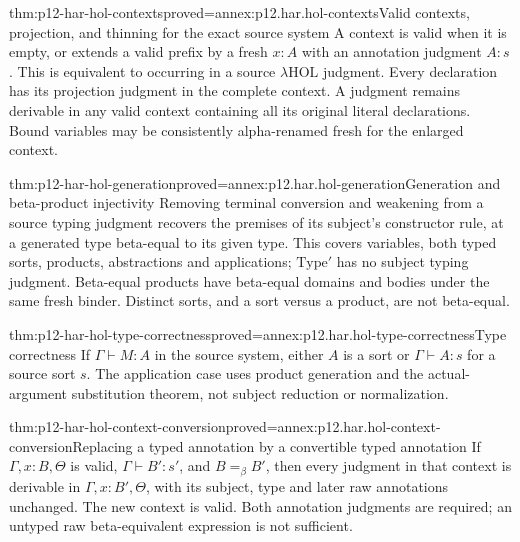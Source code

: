 \begin{hblemma}{thm:p12-har-hol-contexts}{proved=annex:p12.har.hol-contexts}{Valid contexts, projection, and thinning for the exact source system}
A context is valid when it is empty, or extends a valid prefix by a
fresh \(x:A\) with an annotation judgment \(A:s\). This is
equivalent to occurring in a source \(\lambda\mathrm{HOL}\)
judgment. Every declaration has its projection judgment in the complete
context. A judgment remains derivable in any valid context containing
all its original literal declarations. Bound variables may be
consistently alpha-renamed fresh for the enlarged context.
\end{hblemma}

\begin{hblemma}{thm:p12-har-hol-generation}{proved=annex:p12.har.hol-generation}{Generation and beta-product injectivity}
Removing terminal conversion and weakening from a source typing judgment
recovers the premises of its subject's constructor rule, at a generated
type beta-equal to its given type. This covers variables, both typed
sorts, products, abstractions and applications; \(\mathrm{Type}'\)
has no subject typing judgment. Beta-equal products have beta-equal
domains and bodies under the same fresh binder. Distinct sorts, and a
sort versus a product, are not beta-equal.
\end{hblemma}

\begin{hblemma}{thm:p12-har-hol-type-correctness}{proved=annex:p12.har.hol-type-correctness}{Type correctness}
If \(\Gamma\vdash M:A\) in the source system, either \(A\)
is a sort or \(\Gamma\vdash A:s\) for a source sort \(s\).
The application case uses product generation and the actual-argument
substitution theorem, not subject reduction or normalization.
\end{hblemma}

\begin{hblemma}{thm:p12-har-hol-context-conversion}{proved=annex:p12.har.hol-context-conversion}{Replacing a typed annotation by a convertible typed annotation}
If \(\Gamma,x:B,\Theta\) is valid,
\(\Gamma\vdash B':s'\), and \(B=_\beta B'\), then every
judgment in that context is derivable in
\(\Gamma,x:B',\Theta\), with its subject, type and later raw
annotations unchanged. The new context is valid. Both annotation
judgments are required; an untyped raw beta-equivalent expression is
not sufficient.
\end{hblemma}

